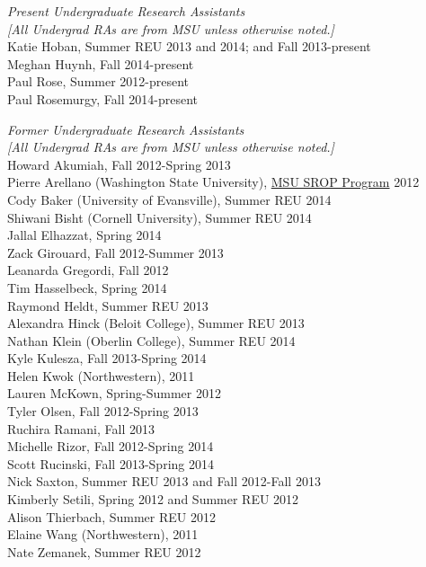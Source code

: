 \documentclass[9pt]{extarticle}
\begin{document}
\emph{Present Undergraduate Research Assistants} \\
\footnotesize
\emph{[All Undergrad RAs are from MSU unless otherwise noted.]\\}
\normalsize
Katie Hoban, Summer REU 2013 and 2014; and Fall 2013-present \\
Meghan Huynh, Fall 2014-present \\
Paul Rose, Summer 2012-present \\
Paul Rosemurgy, Fall 2014-present

\emph{Former Undergraduate Research Assistants} \\
\footnotesize
\emph{[All Undergrad RAs are from MSU unless otherwise noted.]\\}
\normalsize
Howard Akumiah, Fall 2012-Spring 2013 \\
Pierre Arellano (Washington State University), \href{http://grad.msu.edu/srop/}{MSU SROP Program} 2012 \\
Cody Baker (University of Evansville), Summer REU 2014 \\
Shiwani Bisht (Cornell University), Summer REU 2014 \\
Jallal Elhazzat, Spring 2014 \\
Zack Girouard, Fall 2012-Summer 2013 \\
Leanarda Gregordi, Fall 2012 \\
Tim Hasselbeck, Spring 2014 \\
Raymond Heldt, Summer REU 2013 \\
Alexandra Hinck (Beloit College), Summer REU 2013 \\
Nathan Klein (Oberlin College), Summer REU 2014 \\
Kyle Kulesza, Fall 2013-Spring 2014 \\
Helen Kwok (Northwestern), 2011 \\
Lauren McKown, Spring-Summer 2012 \\
Tyler Olsen, Fall 2012-Spring 2013 \\
Ruchira Ramani, Fall 2013 \\
Michelle Rizor, Fall 2012-Spring 2014 \\
Scott Rucinski, Fall 2013-Spring 2014 \\
Nick Saxton, Summer REU 2013 and Fall 2012-Fall 2013 \\
Kimberly Setili, Spring 2012 and Summer REU 2012 \\
Alison Thierbach, Summer REU 2012 \\
Elaine Wang (Northwestern), 2011 \\
Nate Zemanek, Summer REU 2012 \\
\end{document}
